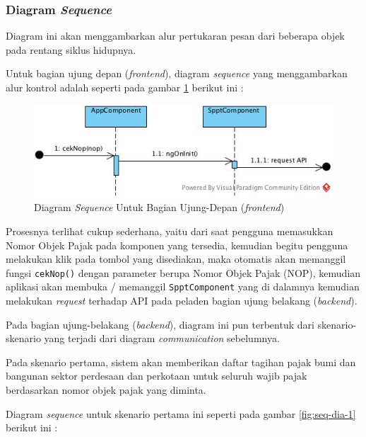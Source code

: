 \documentclass[pdftex,12pt, oneside]{article}
\begin{document}
\subsubsection{Diagram \textit{Sequence}}

Diagram ini akan menggambarkan alur pertukaran pesan dari beberapa objek pada rentang siklus hidupnya. 

Untuk bagian ujung depan (\textit{frontend}), diagram \textit{sequence} yang menggambarkan alur kontrol adalah seperti pada gambar \ref{fig:seq-dia-fe} berikut ini :

\begin{figure}[H]
	\centering
	\includegraphics[width=1\textwidth]{./resources/seq-dia-fe}
	\caption{Diagram \textit{Sequence} Untuk Bagian Ujung-Depan (\textit{frontend})}
	\label{fig:seq-dia-fe}
\end{figure}

Prosesnya terlihat cukup sederhana, yaitu dari saat pengguna memasukkan Nomor Objek Pajak pada komponen yang tersedia, kemudian begitu pengguna melakukan klik pada tombol yang disediakan, maka otomatis akan memanggil fungsi \texttt{cekNop()} dengan parameter berupa Nomor Objek Pajak (NOP), kemudian aplikasi akan membuka / memanggil \texttt{SpptComponent} yang di dalamnya kemudian melakukan \textit{request} terhadap API pada peladen bagian ujung belakang (\textit{backend}).

Pada bagian ujung-belakang (\textit{backend}), diagram ini pun terbentuk dari skenario-skenario yang terjadi dari diagram \textit{communication} sebelumnya.

Pada skenario pertama, sistem akan memberikan daftar tagihan pajak bumi dan bangunan sektor perdesaan dan perkotaan untuk seluruh wajib pajak berdasarkan nomor objek pajak yang diminta. 

Diagram \textit{sequence} untuk skenario pertama ini seperti pada gambar \ref{fig:seq-dia-1} berikut ini :
\end{document}
